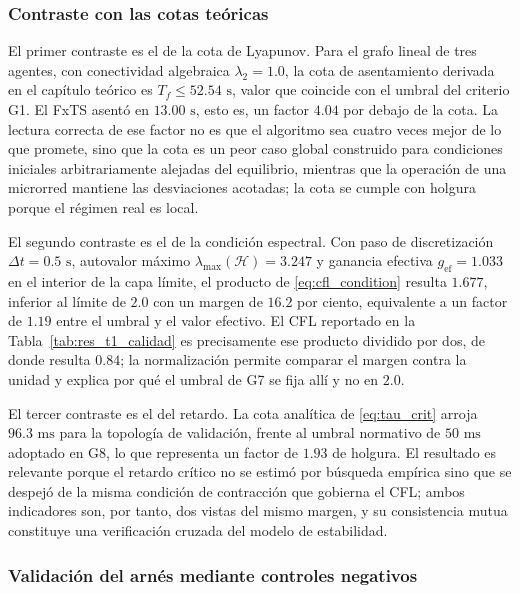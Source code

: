 \subsubsection{Contraste con las cotas teóricas}

El primer contraste es el de la cota de Lyapunov. Para el grafo lineal de tres agentes, con conectividad algebraica $\lambda_2 = 1.0$, la cota de asentamiento derivada en el capítulo teórico es $T_f \le 52.54\text{ s}$, valor que coincide con el umbral del criterio G1. El FxTS asentó en $13.00\text{ s}$, esto es, un factor $4.04$ por debajo de la cota. La lectura correcta de ese factor no es que el algoritmo sea cuatro veces mejor de lo que promete, sino que la cota es un peor caso global construido para condiciones iniciales arbitrariamente alejadas del equilibrio, mientras que la operación de una microrred mantiene las desviaciones acotadas; la cota se cumple con holgura porque el régimen real es local.

El segundo contraste es el de la condición espectral. Con paso de discretización $\Delta t = 0.5\text{ s}$, autovalor máximo $\lambda_{\max}(\mathcal{H}) = 3.247$ y ganancia efectiva $g_{\text{ef}} = 1.033$ en el interior de la capa límite, el producto de \eqref{eq:cfl_condition} resulta $1.677$, inferior al límite de $2.0$ con un margen de $16.2$ por ciento, equivalente a un factor de $1.19$ entre el umbral y el valor efectivo. El CFL reportado en la Tabla~\ref{tab:res_t1_calidad} es precisamente ese producto dividido por dos, de donde resulta $0.84$; la normalización permite comparar el margen contra la unidad y explica por qué el umbral de G7 se fija allí y no en $2.0$.

El tercer contraste es el del retardo. La cota analítica de \eqref{eq:tau_crit} arroja $96.3\text{ ms}$ para la topología de validación, frente al umbral normativo de $50\text{ ms}$ adoptado en G8, lo que representa un factor de $1.93$ de holgura. El resultado es relevante porque el retardo crítico no se estimó por búsqueda empírica sino que se despejó de la misma condición de contracción que gobierna el CFL; ambos indicadores son, por tanto, dos vistas del mismo margen, y su consistencia mutua constituye una verificación cruzada del modelo de estabilidad.

\subsubsection{Validación del arnés mediante controles negativos}

